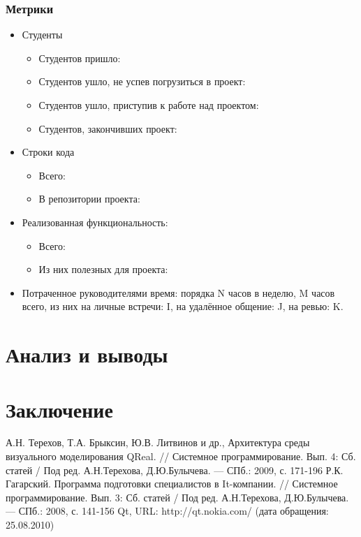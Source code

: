 \documentclass[a5paper]{article}
\begin{document}
\subsubsection{Метрики}
\begin{itemize}
	\item Студенты
		\begin{itemize}
			\item Студентов пришло: 
			\item Студентов ушло, не успев погрузиться в проект:
			\item Студентов ушло, приступив к работе над проектом:
			\item Студентов, закончивших проект:
		\end{itemize}
	\item Строки кода
		\begin{itemize}
			\item Всего:
			\item В репозитории проекта:
		\end{itemize}
	\item Реализованная функциональность:
		\begin{itemize}
			\item Всего: 
			\item Из них полезных для проекта: 
		\end{itemize}
	\item Потраченное руководителями время: порядка N часов в неделю, M часов всего, из них на личные встречи: I, на удалённое общение: J, на ревью: K.
\end{itemize}

\section{Анализ и выводы}

\section*{Заключение}

\pagebreak

\begin{thebibliography}{9000}
   А.Н. Терехов, Т.А. Брыксин, Ю.В. Литвинов и др., Архитектура среды визуального моделирования QReal. // Системное 
программирование. Вып. 4: Сб. статей / Под ред. А.Н.Терехова, Д.Ю.Булычева. --- СПб.: 2009, с. 171-196
   Р.К. Гагарский. Программа подготовки специалистов в It-компании. // Системное 
программирование. Вып. 3: Сб. статей / Под ред. А.Н.Терехова, Д.Ю.Булычева. --- СПб.: 2008, с. 141-156
   Qt, URL: http://qt.nokia.com/ (дата обращения: 25.08.2010)
\end{thebibliography}
  
\end{document}
